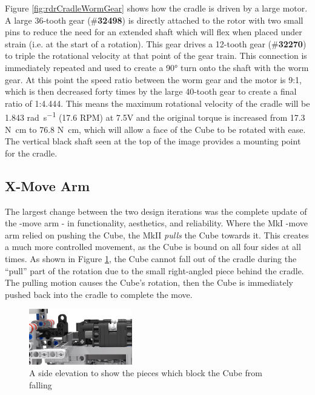\documentclass{report}
\newcommand{\tbo}[1]{\textbf{#1}}
\newcommand{\tit}[1]{\textit{#1}}
\newcommand{\legopiece}[1]{(\#\tbo{#1})}
\newcommand{\move}[1]{\uppercase{\texttt{\formatmovesnospace{#1}}}-move}
\begin{document}
	Figure \ref{fig:rdrCradleWormGear} shows how the cradle is driven by a large motor. A large 36-tooth gear \legopiece{32498} is directly attached to the rotor with two small pins to reduce the need for an extended shaft which will flex when placed under strain (i.e. at the start of a rotation). This gear drives a 12-tooth gear \legopiece{32270} to triple the rotational velocity at that point of the gear train. This connection is immediately repeated and used to create a \ang{90} turn onto the shaft with the worm gear. At this point the speed ratio between the worm gear and the motor is 9:1, which is then decreased forty times by the large 40-tooth gear to create a final ratio of 1:4.444. This means the maximum rotational velocity of the cradle will be 1.843 \si{\radian\per\second} (17.6 RPM) at 7.5\si{\volt} and the original torque is increased from 17.3 \si{\newton\centi\metre} to 76.8 \si{\newton\centi\metre}, which will allow a face of the Cube to be rotated with ease. The vertical black shaft seen at the top of the image provides a mounting point for the cradle.
	
	\subsection{X-Move Arm}
    
    The largest change between the two design iterations was the complete update of the \move{x} arm - in functionality, aesthetics, and reliability. Where the MkI \move{x} arm relied on pushing the Cube, the MkII \tit{pulls} the Cube towards it. This creates a much more controlled movement, as the Cube is bound on all four sides at all times. As shown in Figure \ref{fig:rdrXMoveBlock}, the Cube cannot fall out of the cradle during the \enquote{pull} part of the rotation due to the small right-angled piece behind the cradle. The pulling motion causes the Cube's rotation, then the Cube is immediately pushed back into the cradle to complete the move.
   	
	\begin{figure}[H]
		\includegraphics[width=0.4\textwidth]{Resources/Images/rdrXMoveBlock.png}
		\caption{A side elevation to show the pieces which block the Cube from falling}
		\label{fig:rdrXMoveBlock}
   	\end{figure}
   
\end{document}
